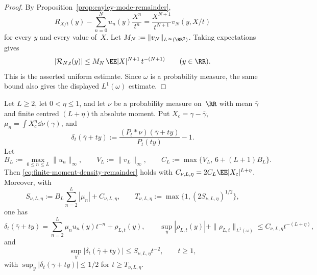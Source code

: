 \begin{proof}
By Proposition~\ref{prop:cayley-mode-remainder},
\[
R_{X/t}(y)-\sum_{n=0}^{N}u_n(y)\frac{X^n}{t^n}
=\frac{X^{N+1}}{t^{N+1}}v_N(y,X/t)
\]
for every $y$ and every value of~$X$.  Let
$M_N:=\|v_N\|_{L^\infty(\RR^2)}$.  Taking expectations gives
\[
|\mathcal R_{N,t}(y)|
\le M_N\,\EE|X|^{N+1}\,t^{-(N+1)}
\qquad(y\in\RR).
\]
This is the asserted uniform estimate.  Since $\omega$ is a probability
measure, the same bound also gives the displayed $L^1(\omega)$ estimate.
\end{proof}

\begin{theorem}%
\label{thm:finite-moment-density-remainder}
Let $L\ge2$, let $0<\eta\le1$, and let $\nu$ be a probability measure
on~$\RR$ with mean $\bar{\gamma}$ and finite centred $(L+\eta)$th absolute
moment.  Put
$X_c=\gamma-\bar{\gamma}$,
$\mu_n=\int X_c^n\dd\nu(\gamma)$, and
\[
\delta_t(\bar{\gamma}+ty):=\frac{(P_t*\nu)(\bar{\gamma}+ty)}
{P_t(ty)}-1.
\]
Let
\[
B_L:=\max_{0\le n\le L}\|u_n\|_\infty,
\qquad
V_L:=\|v_L\|_\infty,
\qquad
C_L:=\max\{V_L,\,6+(L+1)B_L\}.
\]
Then \eqref{eq:finite-moment-density-remainder} holds with
$C_{\nu,L,\eta}=2C_L\EE|X_c|^{L+\eta}$.  Moreover, with
\[
S_{\nu,L,\eta}:=
B_L\sum_{n=2}^{L}|\mu_n|+C_{\nu,L,\eta},
\qquad
T_{\nu,L,\eta}:=\max\{1,(2S_{\nu,L,\eta})^{1/2}\},
\]
one has
\begin{equation}\label{eq:finite-moment-density-remainder}
\delta_t(\bar{\gamma}+ty)
=\sum_{n=2}^{L}\mu_n u_n(y)t^{-n}+\rho_{L,t}(y),
\qquad
\sup_y|\rho_{L,t}(y)|+\|\rho_{L,t}\|_{L^1(\omega)}
\le C_{\nu,L,\eta}t^{-(L+\eta)},
\end{equation}
and
\begin{equation}\label{eq:finite-moment-density-smallness}
\sup_y|\delta_t(\bar{\gamma}+ty)|\le S_{\nu,L,\eta}t^{-2},
\qquad t\ge1,
\end{equation}
with $\sup_y|\delta_t(\bar{\gamma}+ty)|\le1/2$ for
$t\ge T_{\nu,L,\eta}$.
\end{theorem}

